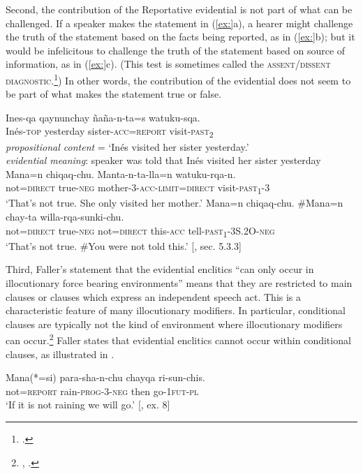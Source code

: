 Second, the contribution of the Reportative evidential is not part of what can be challenged. If a speaker makes the statement in (\ref{ex:}a), a hearer might challenge the truth of the statement based on the facts being reported, as in (\ref{ex:}b); but it would be infelicitous to challenge the truth of the statement based on source of information, as in (\ref{ex:}c). (This test is sometimes called the \textsc{assent/dissent diagnostic}.\footnote{\citet{Papafragou2006}.}) In other words, the contribution of the evidential does not seem to be part of what makes the statement true or false.


\ea
\ea
\gll Ines-qa  qaynunchay  ñaña-n-ta=s  watuku-sqa.\\
Inés-\textsc{top}  yesterday  sister-\textsc{acc}=\textsc{report}  visit\textsc{-past}\textsc{\textsubscript{2}}\\
\glt \textit{propositional content} = ‘Inés visited her sister yesterday.’\\
\textit{evidential meaning}: speaker was told that Inés visited her sister yesterday
\ex \gll  Mana=n  chiqaq-chu.  Manta-n-ta-lla=n  watuku-rqa-n.\\
not=\textsc{direct}  true-\textsc{neg}  mother-3-\textsc{acc}-\textsc{limit}=\textsc{direct}  visit-\textsc{past\textsubscript{1}}-3\\
\glt ‘That’s not true. She only visited her mother.’
\ex \gll  Mana=n  chiqaq-chu.  \#Mana=n  chay-ta  willa-rqa-sunki-chu.\\
not=\textsc{direct}  true-\textsc{neg}  not=\textsc{direct}  this-\textsc{acc}  tell\textsc{-past}\textsc{\textsubscript{1}}-3S.2O-\textsc{neg}\\
\glt ‘That’s not true. \#You were not told this.’  [\citealt{Faller2002}, sec. 5.3.3]
\z \z


Third, Faller’s statement that the evidential enclitics “can only occur in illocutionary force bearing environments” means that they are restricted to main clauses or clauses which express an independent speech act. This is a characteristic feature of many illocutionary modifiers. In particular, conditional clauses are typically not the kind of environment where illocutionary modifiers can occur.\footnote{\citet{Ernst2009}, \citet{Haegeman2010a}.} Faller states that evidential enclitics cannot occur within conditional clauses, as illustrated in .


\ea
\gll Mana(*=si)  para-sha-n-chu  chayqa  ri-sun-chis.\\
not=\textsc{report}  rain-\textsc{prog}-3-\textsc{neg}  then  go-1\textsc{fut}-\textsc{pl}\\
\glt ‘If it is not raining we will go.’  [\citealt{Faller2003}, ex. 8]
\z


